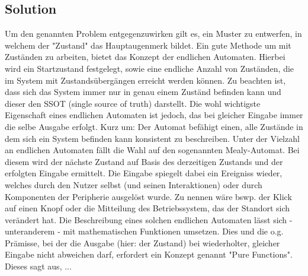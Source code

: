 \subsection{Solution}
\label{subsec:solution}

Um den genannten Problem entgegenzuwirken gilt es, ein Muster zu entwerfen,
in welchem der "Zustand" das Hauptaugenmerk bildet.
Ein gute Methode um mit Zuständen zu arbeiten, bietet das Konzept der endlichen Automaten.
Hierbei wird ein Startzustand festgelegt, sowie eine endliche Anzahl von Zuständen, die im System mit
Zustandsübergängen erreicht werden können. Zu beachten ist, dass sich das System immer nur in genau
einem Zuständ befinden kann und dieser den SSOT (single source of truth) darstellt.
Die wohl wichtigste Eigenschaft eines endlichen Automaten ist jedoch, das bei gleicher Eingabe
immer die selbe Ausgabe erfolgt.
Kurz um: Der Automat befähigt einen, alle Zustände in dem sich ein System befinden kann
konsistent zu beschreiben. 
Unter der Vielzahl an endlichen Automaten fällt die Wahl auf den sogenannten Mealy-Automat.
Bei diesem wird der nächste Zustand auf Basis des derzeitigen Zustands und der erfolgten Eingabe ermittelt.
Die Eingabe spiegelt dabei ein Ereigniss wieder, welches durch den Nutzer selbst (und seinen Interaktionen) 
oder durch Komponenten der Peripherie ausgelöst wurde. Zu nennen wäre bswp. 
der Klick auf einen Knopf oder die Mitteilung des Betriebssystem, das der Standort sich verändert hat.
Die Beschreibung eines solchen endlichen Automaten lässt sich - unteranderem - mit
mathematischen Funktionen umsetzen. Dies und die o.g. Prämisse, bei der die Ausgabe (hier: der Zustand) bei wiederholter,
gleicher Eingabe nicht abweichen darf, erfordert ein Konzept genannt "Pure Functions".
Dieses sagt aus, ...
